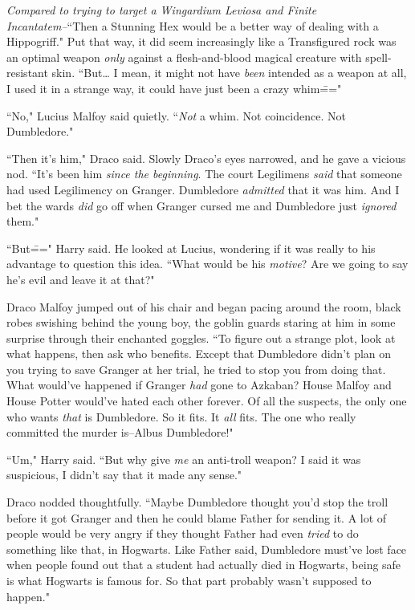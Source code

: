 \emph{Compared to trying to target a Wingardium Leviosa and Finite Incantatem\---}``Then a Stunning Hex would be a better way of dealing with a Hippogriff." Put that way, it did seem increasingly like a Transfigured rock was an optimal weapon \emph{only} against a flesh-and-blood magical creature with spell-resistant skin. ``But{\ldots} I mean, it might not have \emph{been} intended as a weapon at all, I used it in a strange way, it could have just been a crazy whim\==="

``No," Lucius Malfoy said quietly. ``\emph{Not} a whim. Not coincidence. Not Dumbledore."

``Then it's him," Draco said. Slowly Draco's eyes narrowed, and he gave a vicious nod. ``It's been him \emph{since the beginning}. The court Legilimens \emph{said} that someone had used Legilimency on Granger. Dumbledore \emph{admitted} that it was him. And I bet the wards \emph{did} go off when Granger cursed me and Dumbledore just \emph{ignored} them."

``But\===" Harry said. He looked at Lucius, wondering if it was really to his advantage to question this idea. ``What would be his \emph{motive}? Are we going to say he's evil and leave it at that?"

Draco Malfoy jumped out of his chair and began pacing around the room, black robes swishing behind the young boy, the goblin guards staring at him in some surprise through their enchanted goggles. ``To figure out a strange plot, look at what happens, then ask who benefits. Except that Dumbledore didn't plan on you trying to save Granger at her trial, he tried to stop you from doing that. What would've happened if Granger \emph{had} gone to Azkaban? House Malfoy and House Potter would've hated each other forever. Of all the suspects, the only one who wants \emph{that} is Dumbledore. So it fits. It \emph{all} fits. The one who really committed the murder is\---Albus Dumbledore!"

``Um," Harry said. ``But why give \emph{me} an anti-troll weapon? I said it was suspicious, I didn't say that it made any sense."

Draco nodded thoughtfully. ``Maybe Dumbledore thought you'd stop the troll before it got Granger and then he could blame Father for sending it. A lot of people would be very angry if they thought Father had even \emph{tried} to do something like that, in Hogwarts. Like Father said, Dumbledore must've lost face when people found out that a student had actually died in Hogwarts, being safe is what Hogwarts is famous for. So that part probably wasn't supposed to happen."

